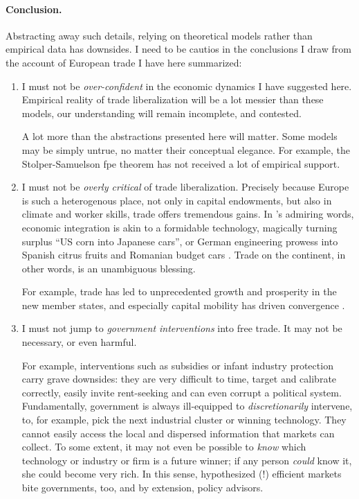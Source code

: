 \paragraph{Conclusion.}
Abstracting away such details, relying on theoretical models rather than empirical data has downsides.
I need to be cautios in the conclusions I draw from the account of European trade I have here summarized:
\begin{enumerate}
	\item I must not be \emph{over-confident} in the economic dynamics I have suggested here.
	Empirical reality of trade liberalization will be a lot messier than these models, our understanding will remain incomplete, and contested.

	A lot more than the abstractions presented here will matter.
	Some models may  be simply untrue, no matter their conceptual elegance.
	For example, the Stolper-Samuelson \gls{fpe} theorem has not received a lot of empirical support.
	\item I must not be \emph{overly critical} of trade liberalization.
	Precisely because Europe is such a heterogenous place, not only in capital endowments, but also in climate and worker skills, trade offers tremendous gains.
	In \citeauthor{Mankiw-2004-aa}'s admiring words, economic integration is akin to a formidable technology, magically turning surplus ``US corn into Japanese cars'', or German engineering prowess into Spanish citrus fruits and Romanian budget cars \citeyearpar[212]{Mankiw-2004-aa}.
	Trade on the continent, in other words, is an unambiguous blessing.

	For example, trade has led to unprecedented growth and prosperity in the new member states, and especially capital mobility has driven convergence \citep{Abiad2007}.
	\item I must not jump to \emph{government interventions} into free trade.
	It may not be necessary, or even harmful.

	For example, interventions such as subsidies or infant industry protection carry grave downsides:
	they are very difficult to time, target and calibrate correctly, easily invite rent-seeking and can even corrupt a political system.
	Fundamentally, government is always ill-equipped to \emph{discretionarily} intervene, to, for example, pick the next industrial cluster or winning technology.
	They cannot easily access the local and dispersed information that markets can collect.
	To some extent, it may not even be possible to \emph{know} which technology or industry or firm is a future winner;
	if any person \emph{could} know it, she could become very rich.
	In this sense, hypothesized (!) efficient markets bite governments, too, and by extension, policy advisors.
\end{enumerate}

